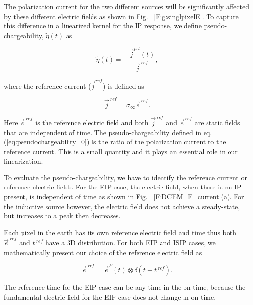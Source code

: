 \documentclass[letterpaper,11pt]{article}
\newcommand{\siginf}{\sigma_\infty}
\renewcommand {\j}  { {\vec j} }
\newcommand {\e}  { {\vec e} }
\newcommand{\peta}{\tilde{\eta}}
\newcommand{\eref}{\e^{\ ref}}
\begin{document}
The polarization current for the two different sources will be significantly affected by these different electric fields as shown in Fig. ~\ref{Fig:singlpixelE}. 
To capture this difference in a linearized kernel for the IP response, we define pseudo-chargeability, $\peta(t)$ as 
\begin{linenomath*}
\begin{equation}
  \peta(t) = -\frac{\j^{pol}(t)}{\j^{\ ref}},
  \label{eq:pseudochargeability_0}
\end{equation}
\end{linenomath*}
where the reference current ($\j^{ref}$) is defined as 
\begin{linenomath*}
\begin{equation}
  \j^{\ ref} = \siginf \eref.
  \label{eq:reference_current}
\end{equation}
\end{linenomath*}
Here $\eref$ is the reference electric field and both $\j^{\ ref}$ and $\eref$ are static fields that are independent of time. 
The pseudo-chargeability defined in eq. (\ref{eq:pseudochargeability_0})  is the ratio of  the polarization current to the reference current. This is a small quantity and it plays an essential role in our linearization. 

To evaluate the pseudo-chargeability, we have to identify the reference current or reference electric fields. For the EIP case, the electric field, when there is no IP present, is independent of time as shown in Fig. ~\ref{F:DCEM_F_current}(a). For the inductive source however, the electric field does not achieve a steady-state, but increases to a  peak then decreases. 

Each pixel in the earth has its own reference electric field and time thus  both $\eref$ and $t^{\ ref}$ have a 3D distribution. 
For both EIP and ISIP cases, we mathematically present our choice of the reference electric field as
\begin{linenomath*}
\begin{equation}
  \eref = \e^{F}(t) \otimes \delta(t-t^{\ ref}). 
  \label{eq:reference_electricfield}
\end{equation}
\end{linenomath*}
The reference time for the EIP case can be any time in the on-time, because the fundamental electric field for the EIP case does not change in on-time. 
\end{document}
